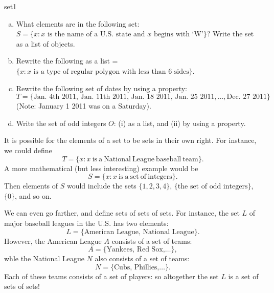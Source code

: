 \begin{exercise}{set1}
\begin{enumerate}[(a)]
\item
What elements are in the following set:  $S = \{x : x  \textrm{ is the name of a U.S. state and } x  \textrm{ begins with `W'} \}$?  Write the set as a list of objects.
\item
Rewrite the following as a list =$\{x : x \textrm{ is a type of regular polygon with less than 6 sides} \}$.
\item
Rewrite the following set of dates by using a property:  $T = \{ \textrm{Jan. 4th  2011, Jan. 11th  2011, Jan. 18  2011, Jan. 25  2011}, \ldots, \textrm{Dec. 27 2011} \}$ (Note: January 1 2011 was on a Saturday).
\item
Write the set of odd integers $O$: (i) as a list, and (ii) by using a property.
\end{enumerate}
\end{exercise}

It is possible for the elements of a set to be sets in their own right. For instance,  we could define
\[T = \{ x : x \mathrm{~is~a~National~League~baseball~team} \}. \]
A more mathematical (but less interesting) example would be
\[S = \{ x : x \mathrm{~is~a~set~of~integers} \}. \]
Then elements of $S$ would include the sets $\{1,2,3,4\}$, $\{\textrm{the set of odd integers}\}$, $\{ 0 \}$, and so on. 

We can even go farther, and define sets of sets of sets. For instance, the set $L$ of major baseball leagues in the U.S. has two elements: 
\[L = \{ \text{American League, National League} \}. \]
However, the American League $A$ consists of a set of teams:
\[A = \{ \text{Yankees, Red Sox,} \ldots \}, \]
whle the National League $N$ also consists of a set of teams:
\[N = \{ \text{Cubs, Phillies,} \ldots \}. \]
Each of these teams consists of a set of players: so altogether the set $L$ is a set of sets of sets!

